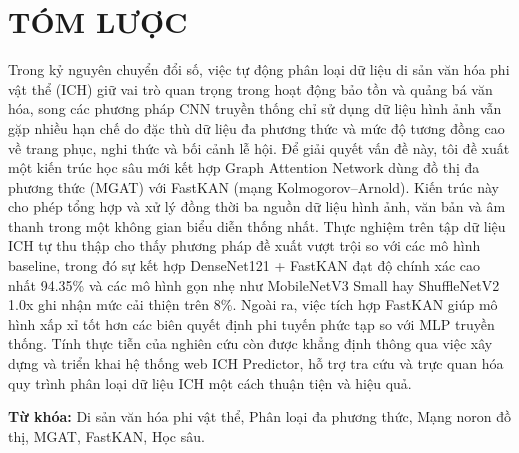 \chapter{TÓM LƯỢC}
\indent\indent Trong kỷ nguyên chuyển đổi số, việc tự động phân loại dữ liệu di sản văn hóa phi vật thể (ICH) giữ vai trò quan trọng trong hoạt động bảo tồn và quảng bá văn hóa, song các phương pháp CNN truyền thống chỉ sử dụng dữ liệu hình ảnh vẫn gặp nhiều hạn chế do đặc thù dữ liệu đa phương thức và mức độ tương đồng cao về trang phục, nghi thức và bối cảnh lễ hội. Để giải quyết vấn đề này, tôi đề xuất một kiến trúc học sâu mới kết hợp Graph Attention Network dùng đồ thị đa phương thức (MGAT) với FastKAN (mạng Kolmogorov–Arnold). Kiến trúc này cho phép tổng hợp và xử lý đồng thời ba nguồn dữ liệu hình ảnh, văn bản và âm thanh trong một không gian biểu diễn thống nhất. Thực nghiệm trên tập dữ liệu ICH tự thu thập cho thấy phương pháp đề xuất vượt trội so với các mô hình baseline, trong đó sự kết hợp DenseNet121 + FastKAN đạt độ chính xác cao nhất 94.35\% và các mô hình gọn nhẹ như MobileNetV3 Small hay ShuffleNetV2 1.0x ghi nhận mức cải thiện trên 8\%. Ngoài ra, việc tích hợp FastKAN giúp mô hình xấp xỉ tốt hơn các biên quyết định phi tuyến phức tạp so với MLP truyền thống. Tính thực tiễn của nghiên cứu còn được khẳng định thông qua việc xây dựng và triển khai hệ thống web ICH Predictor, hỗ trợ tra cứu và trực quan hóa quy trình phân loại dữ liệu ICH một cách thuận tiện và hiệu quả.\vspace{0.3cm}

\textbf{Từ khóa:} Di sản văn hóa phi vật thể, Phân loại đa phương thức, Mạng noron đồ thị, MGAT, FastKAN, Học sâu.